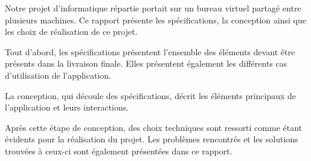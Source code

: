 Notre projet d'informatique répartie portait sur un bureau virtuel partagé entre plusieurs machines. Ce rapport présente les spécifications, la conception ainsi que les choix de réalisation de ce projet.

Tout d'abord, les spécifications présentent l'ensemble des éléments devant être présents dans la livraison finale. Elles présentent également les différents cas d'utilisation de l'application.

La conception, qui découle des spécifications, décrit les éléments principaux de l'application et leurs interactions. 

Après cette étape de conception, des choix techniques sont ressorti comme étant évidents pour la réalisation du projet. Les problèmes rencontrés et les solutions trouvées à ceux-ci sont également présentées dans ce rapport.